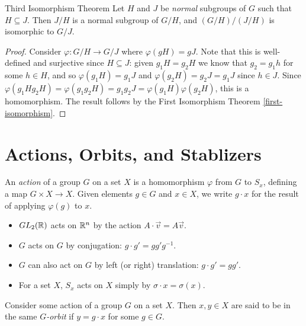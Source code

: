 \begin{thm}Third Isomorphism Theorem\label{third-isomorphism}\proofbreak
    Let $H$ and $J$ be \emph{normal} subgroups of $G$ such that $H \subseteq J$. Then $J/H$ is a normal subgroup of $G/H$, and $(G/H)/(J/H)$ is isomorphic to $G/J$.
\end{thm}

\begin{proof}
    Consider $\varphi: G/H \to G/J$ where $\varphi(gH) = gJ$. Note that this is well-defined and surjective since $H \subseteq J$: given $g_1H = g_2H$ we know that $g_2 = g_1h$ for some $h \in H$, and so $\varphi(g_1H) = g_1J$ and $\varphi(g_2H) = g_2J = g_1J$ since $h \in J$. Since $\varphi(g_1Hg_2H) = \varphi(g_1g_2H) = g_1g_2J = \varphi(g_1H)\varphi(g_2H)$, this is a homomorphism. The result follows by the First Isomorphism Theorem \ref{first-isomorphism}.
\end{proof}

\section{Actions, Orbits, and Stablizers}

\begin{defn}
    An \emph{action} of a group $G$ on a set $X$ is a homomorphism $\varphi$ from $G$ to $S_x$, defining a map $G \times X \to X$. Given elements $g \in G$ and $x \in X$, we write $g \cdot x$ for the result of applying $\varphi(g)$ to $x$.
\end{defn}

\begin{exmp}\proofbreak
    \begin{itemize}
        \item $GL_2(\mathbb{R})$ acts on $\mathbb{R}^n$ by the action $A \cdot \vec{v} = A\vec{v}$.
        \item $G$ acts on $G$ by conjugation: $g \cdot g' = gg'g^{-1}$.
        \item $G$ can also act on $G$ by left (or right) translation: $g \cdot g' = gg'$.
        \item For a set $X$, $S_x$ acts on $X$ simply by $\sigma \cdot x = \sigma(x)$.
    \end{itemize}
\end{exmp}

\begin{defn}
    Consider some action of a group $G$ on a set $X$. Then $x, y \in X$ are said to be in the same \emph{$G$-orbit} if $y = g \cdot x$ for some $g \in G$.
\end{defn}

